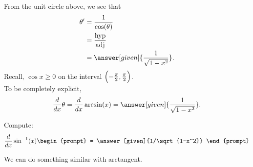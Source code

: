 \documentclass{ximera}
\begin{document}
\begin{theorem}
\begin{explanation}
\begin{image}
  \end{image}
  From the unit circle above, we see that 
  \begin{align*}
    \theta' &= \frac{1}{\cos(\theta)}\\
    &=\frac{\mathrm{hyp}}{\mathrm{adj}}\\
    &= \answer[given]{\frac{1}{\sqrt{1-x^2}}}.
  \end{align*}
   Recall, $\cos{x}\ge0$ on the interval $\Bigl(-\frac{\pi}{2},\frac{\pi}{2}\Bigr)$.\\
   
  To be completely explicit, 
  \[
  \frac{d}{dx} \theta = \frac{d}{dx} \arcsin(x) = \answer[given]{\frac{1}{\sqrt{1-x^2}}}.
  \]
 
\end{explanation}
\end{theorem}


\begin{question}
  Compute:
  \[
  \frac{d}{dx} \sin^{-1}(x)
  \begin{prompt}
    = \answer[given]{1/\sqrt{1-x^2}}
  \end{prompt}
  \]
\end{question}



We can do something similar with arctangent. 
\end{document}
